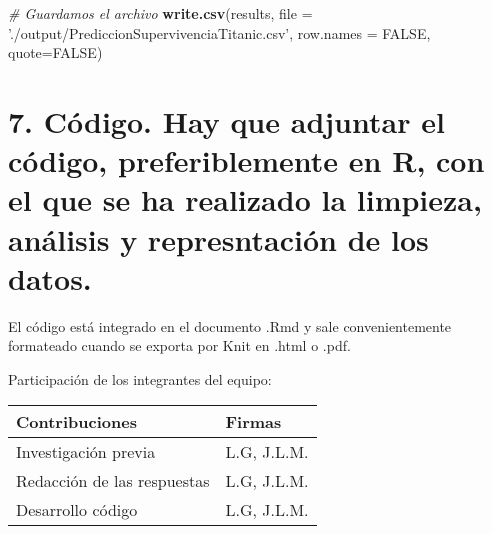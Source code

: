 \documentclass[]{article}
\newenvironment{Shaded}{\begin{snugshade}}{\end{snugshade}}
\newcommand{\KeywordTok}[1]{\textcolor[rgb]{0.13,0.29,0.53}{\textbf{#1}}}
\newcommand{\DataTypeTok}[1]{\textcolor[rgb]{0.13,0.29,0.53}{#1}}
\newcommand{\StringTok}[1]{\textcolor[rgb]{0.31,0.60,0.02}{#1}}
\newcommand{\CommentTok}[1]{\textcolor[rgb]{0.56,0.35,0.01}{\textit{#1}}}
\newcommand{\OtherTok}[1]{\textcolor[rgb]{0.56,0.35,0.01}{#1}}
\newcommand{\NormalTok}[1]{#1}
\begin{document}
\begin{Shaded}
\begin{Highlighting}[]
\CommentTok{# Guardamos el archivo}
\KeywordTok{write.csv}\NormalTok{(results, }\DataTypeTok{file =} \StringTok{'./output/PrediccionSupervivenciaTitanic.csv'}\NormalTok{, }\DataTypeTok{row.names =} \OtherTok{FALSE}\NormalTok{, }\DataTypeTok{quote=}\OtherTok{FALSE}\NormalTok{)}
\end{Highlighting}
\end{Shaded}

\section{7. Código. Hay que adjuntar el código, preferiblemente en R,
con el que se ha realizado la limpieza, análisis y represntación de los
datos.}\label{codigo.-hay-que-adjuntar-el-codigo-preferiblemente-en-r-con-el-que-se-ha-realizado-la-limpieza-analisis-y-represntacion-de-los-datos.}

El código está integrado en el documento .Rmd y sale convenientemente
formateado cuando se exporta por Knit en .html o .pdf.

Participación de los integrantes del equipo:

\begin{Shaded}
\end{Shaded}

\begin{tabular}{l|l}
\hline
Contribuciones & Firmas\\
\hline
Investigación previa & L.G, J.L.M.\\
\hline
Redacción de las respuestas & L.G, J.L.M.\\
\hline
Desarrollo código & L.G, J.L.M.\\
\hline
\end{tabular}
\end{document}
